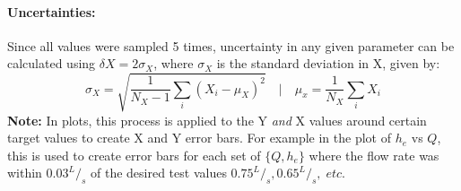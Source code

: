 \documentclass[12pt]{article}
\begin{document}
	\paragraph{Uncertainties:}
	Since all values were sampled 5 times, uncertainty in any given parameter can be calculated using $\delta X = 2\sigma_X$, where $\sigma_X$ is the standard deviation in X, given by:
	\begin{equation}
		\sigma_X = \sqrt{\frac{1}{N_X-1}\sum_{i} (X_i - \mu_X)^2} \quad | \quad \mu_x=\frac{1}{N_X}\sum_i X_i
	\end{equation}
	\textbf{Note:} In plots, this process is applied to the Y \textit{and} X values around certain target values to create X and Y error bars. \hfill\break For example in the plot of $h_e$ vs $Q$, this is used to create error bars for each set of $\{Q,h_e\}$ where the flow rate was within $0.03^{L}/_{s}$ of the desired test values $0.75^{L}/_{s}, 0.65^{L}/_{s}, \; etc.$
	
\end{document}

